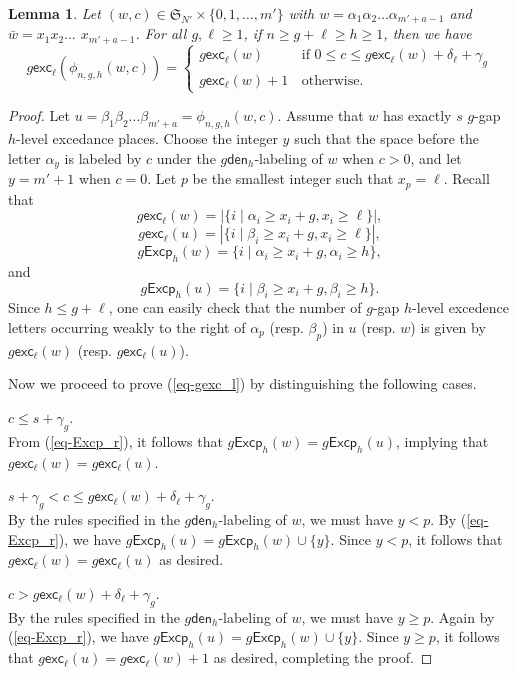 \documentclass[12pt]{article}
\numberwithin{equation}{section}
\theoremstyle{plain}
\newtheorem{lemma}[theorem]{Lemma}
\def\exc{\mathsf{exc}}
\def\den{\mathsf{den}}
\def\Excp{\mathsf{Excp}}
\begin{document}
 
  \begin{lemma}\label{lem-phi-den3}
 Let $(w, c)\in  \mathfrak{S}_{N'}\times  \{0,1, \ldots, m'\}$ with $w=\alpha_1\alpha_2\ldots \alpha_{m'+a-1}$ and  $\bar{w}=x_1x_2\ldots$ $ x_{m'+a-1}$.
  For all $g, \ell\geq 1$, if  $n\geq g+\ell\geq h\geq 1$, then we have
  	\begin{equation}\label{eq-gexc_l}
  	g\exc_\ell(\phi_{n,g,h}(w, c))=\left\{ \begin{array}{ll}
  			g\exc_\ell(w)&\, \mathrm{if}\,\,   0\leq c\leq g\exc_\ell(w) +\delta_\ell+\gamma_g  \\
  			g\exc_{\ell}(w)+1&\, \mathrm{otherwise}.\end{array}
  		\right.
  		\end{equation}
  	  
  	
  	\end{lemma}
 \begin{proof}
 	Let $u=\beta_1\beta_2\ldots\beta_{m'+a}=\phi_{n,g,h}(w,c)$.  Assume that $w$ has exactly $s$ $g$-gap $h$-level excedance places.
 	Choose the integer $y$ such that    the space before  the letter  $\alpha_y$ is labeled by $c$  under the   $g\den_h$-labeling  of $w$ when $c>0$,  and let $y=m'+1$ when $c=0$.   Let $p$ be the smallest  integer such that $x_p=\ell$.   
 	Recall that $$g\exc_\ell(w)=|\{i\mid \alpha_i\geq x_i+g, x_i\geq \ell\}|,$$  
 	$$g\exc_\ell(u)=|\{i\mid \beta_i\geq x_i+g, x_i\geq \ell\}|, $$
 	$$
 	g\Excp_{h}(w)=\{i
 	\mid \alpha_i\geq x_i+g, \alpha_i\geq h\},
 	$$
 	and 
 	$$
 	g\Excp_{h}(u)=\{i
 	\mid \beta_i\geq x_i+g, \beta_i\geq h\}. 
 	$$
  Since $h\leq g+\ell$, one can easily check that    the number of $g$-gap $h$-level excedence letters occurring weakly  to the right of $\alpha_p$ (resp. $\beta_p$) in $u$ (resp. $w$) is given by $g\exc_\ell(w)$ (resp. $g\exc_\ell(u)$).    
   
 	 
 Now we proceed to prove (\ref{eq-gexc_l}) by distinguishing the following cases. 
 
  $c\leq s+\gamma_g$.\\
 	From  (\ref{eq-Excp_r}), it follows that  $g\Excp_h(w)= g\Excp_h(u)$, implying that  $g\exc_\ell(w)= g\exc_\ell(u)$.
 	
 	  $s+\gamma_g< c \leq  g\exc_\ell(w)+\delta_\ell+\gamma_g$.\\ 
 	 By the rules specified in the $g\den_h$-labeling of $w$, we must have  $y<p$. By (\ref{eq-Excp_r}), we have $g\Excp_h(u)= g\Excp_h(w)\cup\{y\}$. Since $y<p$,   it follows that $g\exc_\ell(w)= g\exc_\ell(u)$ as desired. 
 	
 	
 	  $  c >  g\exc_\ell(w)+\delta_\ell+\gamma_g$.\\ 
 		 By the rules specified in the $g\den_h$-labeling of $w$, we must have  $y\geq p$. Again by (\ref{eq-Excp_r}), we have $g\Excp_h(u)= g\Excp_h(w)\cup\{y\}$. Since $y\geq p$,   it follows that $g\exc_\ell(u)= g\exc_\ell(w)+1$ as desired, completing the proof. 
 	\end{proof}
\end{document}
